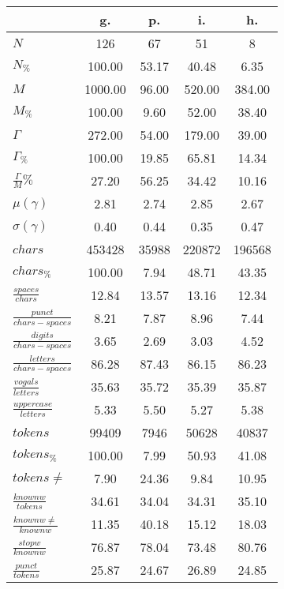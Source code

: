 \begin{table}[h!]
\begin{center}
\begin{tabular}{| l || c | c | c | c |}\hline
 & {\bf g.} & {\bf p.} & {\bf i.} & {\bf h.} \\\hline\hline
$N$ & 126  & 67  & 51  & 8 \\
$N_{\%}$ & 100.00  & 53.17  & 40.48  & 6.35 \\\hline
$M$ & 1000.00  & 96.00  & 520.00  & 384.00 \\
$M_{\%}$ & 100.00  & 9.60  & 52.00  & 38.40 \\\hline
$\Gamma$ & 272.00  & 54.00  & 179.00  & 39.00 \\
$\Gamma_{\%}$ & 100.00  & 19.85  & 65.81  & 14.34 \\\hline
$\frac{\Gamma}{M}\%$ & 27.20  & 56.25  & 34.42  & 10.16 \\
$\mu(\gamma)$ & 2.81  & 2.74  & 2.85  & 2.67 \\
$\sigma(\gamma)$ & 0.40  & 0.44  & 0.35  & 0.47 \\\hline\hline
$chars$ & 453428  & 35988  & 220872  & 196568 \\
$chars_{\%}$ & 100.00  & 7.94  & 48.71  & 43.35 \\\hline
$\frac{spaces}{chars}$ & 12.84  & 13.57  & 13.16  & 12.34 \\
$\frac{punct}{chars-spaces}$ & 8.21  & 7.87  & 8.96  & 7.44 \\
$\frac{digits}{chars-spaces}$ & 3.65  & 2.69  & 3.03  & 4.52 \\\hline
$\frac{letters}{chars-spaces}$ & 86.28  & 87.43  & 86.15  & 86.23 \\
$\frac{vogals}{letters}$ & 35.63  & 35.72  & 35.39  & 35.87 \\
$\frac{uppercase}{letters}$ & 5.33  & 5.50  & 5.27  & 5.38 \\\hline\hline
$tokens$ & 99409  & 7946  & 50628  & 40837 \\
$tokens_{\%}$ & 100.00  & 7.99  & 50.93  & 41.08 \\
$tokens \neq$ & 7.90  & 24.36  & 9.84  & 10.95 \\\hline
$\frac{knownw}{tokens}$ & 34.61  & 34.04  & 34.31  & 35.10 \\
$\frac{knownw \neq}{knownw}$ & 11.35  & 40.18  & 15.12  & 18.03 \\\hline
$\frac{stopw}{knownw}$ & 76.87  & 78.04  & 73.48  & 80.76 \\
$\frac{punct}{tokens}$ & 25.87  & 24.67  & 26.89  & 24.85 \\

\end{tabular}
\end{center}
\end{table}
